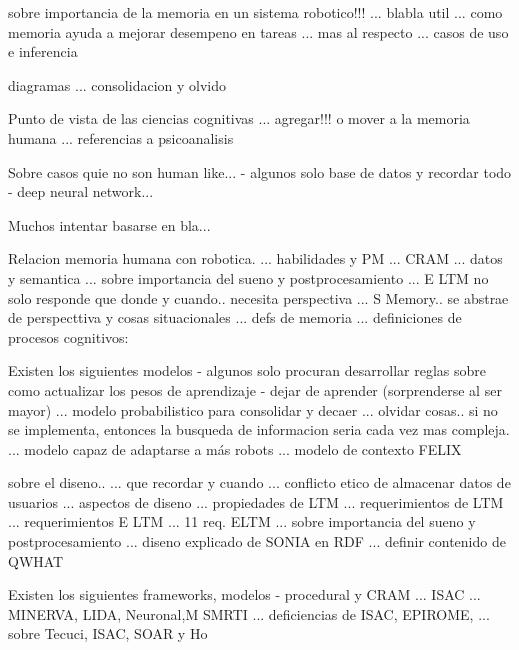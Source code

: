 sobre importancia de la memoria en un sistema robotico!!!
... blabla util \cite{Vijayakumar2014}
... como memoria ayuda a mejorar desempeno en tareas \cite{Salgado2012}
... mas al respecto \cite{Ho2009}
... casos de uso e inferencia \cite{Vijayakumar2014}


diagramas
... consolidacion y olvido \cite{Deutsch2008}

Punto de vista de las ciencias cognitivas
... agregar!!! o mover a la memoria humana
... referencias a psicoanalisis \cite{Deutsch2008}

Sobre casos quie no son human like...
- algunos solo base de datos y recordar todo
- deep neural network... \cite{KimMinJoo2016}


Muchos intentar basarse en bla...


Relacion memoria humana con robotica.
... habilidades y PM \cite{Salgado2012} ... CRAM
... datos y semantica
... sobre importancia del sueno y postprocesamiento \cite{Kelley2014}
 ... E LTM no solo responde que donde y cuando.. necesita perspectiva \cite{Stachowicz2012}
... S Memory.. se abstrae de perspecttiva y cosas situacionales \cite{Stachowicz2012}
... defs de memoria \cite{Deutsch2008}
... definiciones de procesos cognitivos: \cite{Deutsch2008}
 
 
Existen los siguientes modelos
- algunos solo procuran desarrollar reglas sobre como actualizar los pesos de aprendizaje
- dejar de aprender (sorprenderse al ser mayor)
... modelo probabilistico para consolidar y decaer \cite{Dodd2005}
... olvidar cosas.. si no se implementa, entonces la busqueda de informacion seria cada vez mas compleja. \cite{Deutsch2008}
... modelo capaz de adaptarse a m\'as robots \cite{Ho2009}
... modelo de contexto \cite{Sanchez:2015} FELIX

sobre el diseno..
... que recordar y cuando \cite{Kasap2010}
... conflicto etico de almacenar datos de usuarios \cite{Ho2009}
... aspectos de diseno \cite{Ho2009}
... propiedades de LTM \cite{Jockel2008}
... requerimientos de LTM \cite{Vijayakumar2014}
... requerimientos E LTM \cite{Stachowicz2012}
... 11 req. ELTM \cite{Stachowicz2012}
... sobre importancia del sueno y postprocesamiento \cite{Kelley2014}
... diseno explicado de SONIA en RDF \cite{Vijayakumar2014}
... definir contenido de QWHAT \cite{Stachowicz2012}

Existen los siguientes frameworks, modelos
- procedural y CRAM \cite{Winkler2014}
... ISAC \cite{Dodd2005}
... MINERVA, LIDA, Neuronal,M SMRTI \cite{Jockel2008}
... deficiencias de ISAC, EPIROME, \cite{Stachowicz2012}
... sobre Tecuci, ISAC, SOAR y Ho \cite{Deutsch2008}

